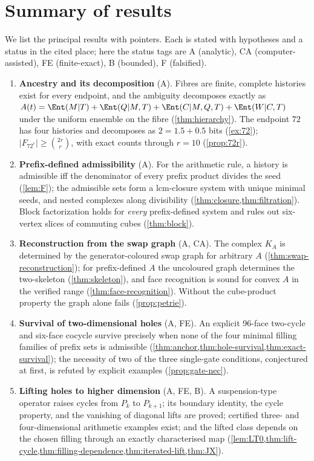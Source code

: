 \section{Summary of results}\label{sec:summary}
We list the principal results with pointers. Each is stated with hypotheses and a status in the cited place; here the status tags are \textsf{A} (analytic), \textsf{CA} (computer-assisted), \textsf{FE} (finite-exact), \textsf{B} (bounded), \textsf{F} (falsified).
\begin{enumerate}[label=\textbf{R\arabic*.},leftmargin=2.6em]
\item \textbf{Ancestry and its decomposition} (\textsf{A}). Fibres are finite, complete histories exist for every endpoint, and the ambiguity decomposes exactly as $A(t)=\Ent(M|T)+\Ent(Q|M,T)+\Ent(C|M,Q,T)+\Ent(W|C,T)$ under the uniform ensemble on the fibre (\cref{thm:hierarchy}). The endpoint $72$ has four histories and decomposes as $2=1.5+0.5$ bits (\cref{ex:72}); $|F_{72^r}|\ge\binom{2r}{r}$, with exact counts through $r=10$ (\cref{prop:72r}).
\item \textbf{Prefix-defined admissibility} (\textsf{A}). For the arithmetic rule, a history is admissible iff the denominator of every prefix product divides the seed (\cref{lem:F}); the admissible sets form a lcm-closure system with unique minimal seeds, and nested complexes along divisibility (\cref{thm:closure,thm:filtration}). Block factorization holds for \emph{every} prefix-defined system and rules out six-vertex slices of commuting cubes (\cref{thm:block}).
\item \textbf{Reconstruction from the swap graph} (\textsf{A}, \textsf{CA}). The complex $K_A$ is determined by the generator-coloured swap graph for arbitrary $A$ (\cref{thm:swap-reconstruction}); for prefix-defined $A$ the uncoloured graph determines the two-skeleton (\cref{thm:skeleton}), and face recognition is sound for convex $A$ in the verified range (\cref{thm:face-recognition}). Without the cube-product property the graph alone fails (\cref{prop:petrie}).
\item \textbf{Survival of two-dimensional holes} (\textsf{A}, \textsf{FE}). An explicit 96-face two-cycle and six-face cocycle survive precisely when none of the four minimal filling families of prefix sets is admissible (\cref{thm:anchor,thm:hole-survival,thm:exact-survival}); the necessity of two of the three single-gate conditions, conjectured at first, is refuted by explicit examples (\cref{prop:gate-nec}).
\item \textbf{Lifting holes to higher dimension} (\textsf{A}, \textsf{FE}, \textsf{B}). A suspension-type operator raises cycles from $P_k$ to $P_{k+1}$; its boundary identity, the cycle property, and the vanishing of diagonal lifts are proved; certified three- and four-dimensional arithmetic examples exist; and the lifted class depends on the chosen filling through an exactly characterised map (\cref{lem:LT0,thm:lift-cycle,thm:filling-dependence,thm:iterated-lift,thm:JX}).

\end{enumerate}

